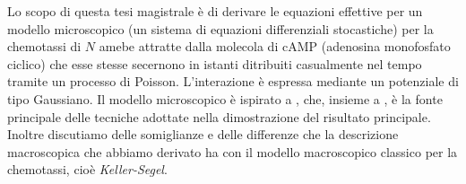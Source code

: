 Lo scopo di questa tesi magistrale è di derivare le equazioni effettive per un modello microscopico (un sistema di equazioni differenziali stocastiche) per la chemotassi di $N$ amebe attratte dalla molecola di cAMP (adenosina monofosfato ciclico) che esse stesse secernono in istanti ditribuiti casualmente nel tempo tramite un processo di Poisson.
L'interazione è espressa mediante un potenziale di tipo Gaussiano.
Il modello microscopico è ispirato a \cite{ana}, che, insieme a \cite{peter-boers}, è la fonte principale delle tecniche adottate nella dimostrazione del risultato principale.
Inoltre discutiamo delle somiglianze e delle differenze che la descrizione macroscopica che abbiamo derivato ha con il modello macroscopico classico per la chemotassi, cioè \emph{Keller-Segel}.